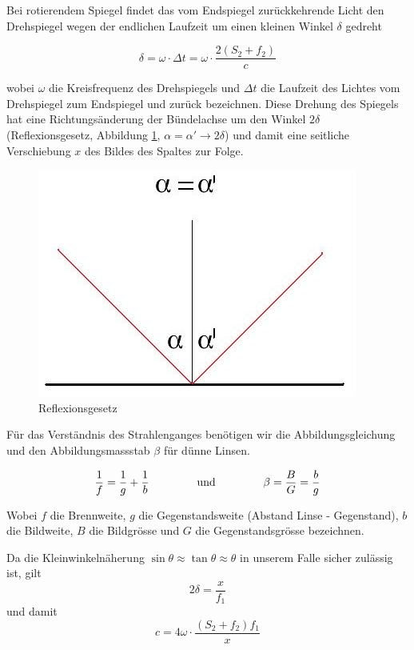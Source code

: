 Bei rotierendem Spiegel  findet das vom Endspiegel  zur\"uckkehrende Licht den
Drehspiegel  wegen der  endlichen Laufzeit  um einen  kleinen Winkel  $\delta$
gedreht

\begin{equation}
    \delta = \omega \cdot \Delta t = \omega \cdot \frac{2(S_2 + f_2)}{c}
    \label{eq:delta}
\end{equation}

wobei $\omega$ die Kreisfrequenz des  Drehspiegels und $\Delta t$ die Laufzeit
des Lichtes  vom Drehspiegel  zum Endspiegel  und zur\"uck  bezeichnen.  Diese
Drehung  des  Spiegels  hat  eine  Richtungs\"anderung  der  B\"undelachse  um
den Winkel $2\delta$  (Reflexionsgesetz, Abbildung \ref{fig:reflexionsgesetz},
$\alpha=\alpha' \to  2\delta$) und damit  eine seitliche Verschiebung  $x$ des
Bildes des Spaltes zur Folge.

\begin{figure}[H]
    \center
    \includegraphics[width=.4\textwidth]{images/reflexionsgesetz.jpg}
    \caption{Reflexionsgesetz}
    \label{fig:reflexionsgesetz}
\end{figure}

F\"ur   das    Verst\"andnis   des   Strahlenganges   ben\"otigen    wir   die
Abbildungsgleichung und den Abbildungsmassstab $\beta$ f\"ur d\"unne Linsen.

\begin{equation}
    \frac{1}{f} = \frac{1}{g} + \frac{1}{b}
    \hspace{15mm}\textrm{und}\hspace{15mm}
    \beta = \frac{B}{G} = \frac{b}{g}
    \label{eq:optik}
\end{equation}

Wobei  $f$  die   Brennweite,  $g$  die  Gegenstandsweite   (Abstand  Linse  -
Gegenstand),   $b$  die   Bildweite,  $B$   die  Bildgr\"osse   und  $G$   die
Gegenstandsgr\"osse bezeichnen.

Da die Kleinwinkeln\"aherung $\sin\theta \approx \tan\theta \approx \theta$ in
unserem Falle sicher zul\"assig ist, gilt
\begin{equation}
    2\delta = \frac{x}{f_1}
\end{equation}
und damit
\begin{equation}
    c = 4\omega \cdot \frac{(S_2 + f_2)f_1}{x}
\end{equation}

